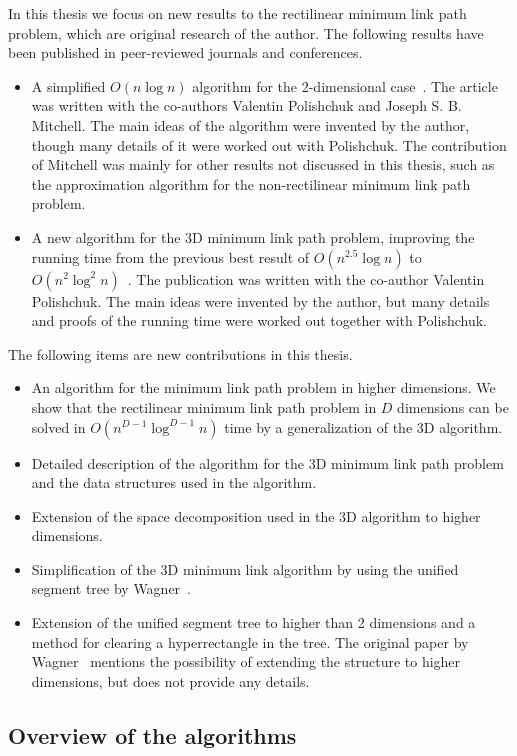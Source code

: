\documentclass[english,gradu]{tktltiki2018}
\begin{document}
In this thesis we focus on new results to the rectilinear minimum link path problem, which are original research of the author.
The following results have been published in peer-reviewed journals and conferences.
\begin{itemize}
\item A simplified $O(n\log n)$ algorithm for the 2-dimensional case~\cite{revisited}.
The article was written with the co-authors Valentin Polishchuk and Joseph S. B. Mitchell.
The main ideas of the algorithm were invented by the author, though many details of it were worked out with Polishchuk.
The contribution of Mitchell was mainly for other results not discussed in this thesis, such as the approximation algorithm for the non-rectilinear minimum link path problem.
\item A new algorithm for the 3D minimum link path problem, improving the running time from the previous best result of $O(n^{2.5}\log n)$ to $O(n^2\log^2 n)$~\cite{restricted}.
The publication was written with the co-author Valentin Polishchuk.
The main ideas were invented by the author, but many details and proofs of the running time were worked out together with Polishchuk.
\end{itemize}

The following items are new contributions in this thesis.

\begin{itemize}
\item An algorithm for the minimum link path problem in higher dimensions.
	We show that the rectilinear minimum link path problem in $D$ dimensions can be solved in $O(n^{D-1}\log^{D-1} n)$ time by a generalization of the 3D algorithm.
\item Detailed description of the algorithm for the 3D minimum link path problem and the data structures used in the algorithm.
\item Extension of the space decomposition used in the 3D algorithm to higher dimensions.
\item Simplification of the 3D minimum link algorithm by using the unified segment tree by Wagner~\cite{unified}.
\item Extension of the unified segment tree to higher than 2 dimensions and a method for clearing a hyperrectangle in the tree.
	The original paper by Wagner~\cite{unified} mentions the possibility of extending the structure to higher dimensions, but does not provide any details.
\end{itemize}

\subsection{Overview of the algorithms}\label{sec:overview}
\end{document}
